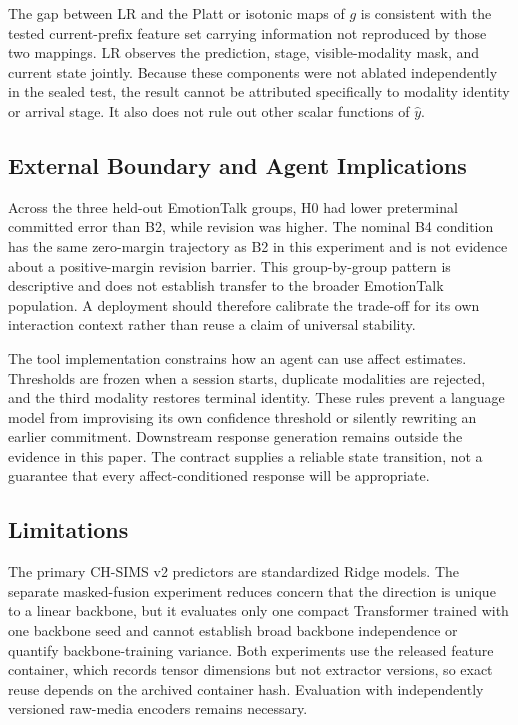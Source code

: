 \documentclass[journal]{IEEEtran}
\begin{document}
The gap between LR and the Platt or isotonic maps of $g$ is consistent with the tested current-prefix feature set carrying information not reproduced by those two mappings. LR observes the prediction, stage, visible-modality mask, and current state jointly. Because these components were not ablated independently in the sealed test, the result cannot be attributed specifically to modality identity or arrival stage. It also does not rule out other scalar functions of $\hat y$.

\subsection{External Boundary and Agent Implications}

Across the three held-out EmotionTalk groups, H0 had lower preterminal committed error than B2, while revision was higher. The nominal B4 condition has the same zero-margin trajectory as B2 in this experiment and is not evidence about a positive-margin revision barrier. This group-by-group pattern is descriptive and does not establish transfer to the broader EmotionTalk population. A deployment should therefore calibrate the trade-off for its own interaction context rather than reuse a claim of universal stability.

The tool implementation constrains how an agent can use affect estimates. Thresholds are frozen when a session starts, duplicate modalities are rejected, and the third modality restores terminal identity. These rules prevent a language model from improvising its own confidence threshold or silently rewriting an earlier commitment. Downstream response generation remains outside the evidence in this paper. The contract supplies a reliable state transition, not a guarantee that every affect-conditioned response will be appropriate.

\subsection{Limitations}
\label{sec:limitations}

The primary CH-SIMS v2 predictors are standardized Ridge models. The separate masked-fusion experiment reduces concern that the direction is unique to a linear backbone, but it evaluates only one compact Transformer trained with one backbone seed and cannot establish broad backbone independence or quantify backbone-training variance. Both experiments use the released feature container, which records tensor dimensions but not extractor versions, so exact reuse depends on the archived container hash. Evaluation with independently versioned raw-media encoders remains necessary.
\end{document}
